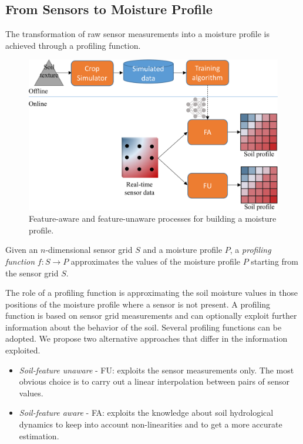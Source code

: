 \subsection{From Sensors to Moisture Profile}
\label{pluto-sec:FromSensorsToMoistureProfile}
The transformation of raw sensor measurements into a moisture profile is achieved through a profiling function. 
\begin{figure}[t]
\centering
\includegraphics[scale=.2]{chapters/physics-aware/pluto/img/process.pdf}
\caption{Feature-aware and feature-unaware processes for building a moisture profile.}
\label{pluto-fig:process}
\end{figure}
\begin{definition}
Given an $n$-dimensional sensor grid $S$ and a moisture profile $P$, a \emph{profiling function} $f : S \rightarrow P$ approximates the values of the moisture profile $P$ starting from the sensor grid $S$.
\end{definition}

The role of a profiling function is approximating the soil moisture values in those positions of the moisture profile where a sensor is not present. 
A profiling function is based on sensor grid measurements and can optionally exploit further information about the behavior of the soil. 
Several profiling functions can be adopted. 
We propose two alternative approaches that differ in the information exploited.
\begin{itemize}
    \item \emph{Soil-feature unaware} - FU: exploits the sensor measurements only. The most obvious choice is to carry out a linear interpolation between pairs of sensor values.
    \item \emph{Soil-feature aware} - FA: exploits the knowledge about soil hydrological dynamics to keep into account non-linearities and to get a more accurate estimation.
\end{itemize}

